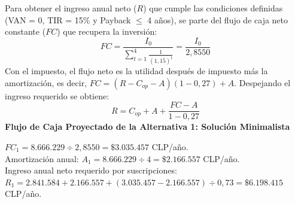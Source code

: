 Para obtener el ingreso anual neto ($R$) que cumple las condiciones definidas (VAN = 0, TIR = 15\% y Payback $\leq$ 4 años), se parte del flujo de caja neto constante ($FC$) que recupera la inversión:
\begin{equation}
    FC = \frac{I_0}{\displaystyle\sum_{t=1}^{4} \frac{1}{(1{,}15)^t}} = \frac{I_0}{2{,}8550}
\end{equation}
Con el impuesto, el flujo neto es la utilidad después de impuesto más la amortización, es decir, $FC = (R - C_{op} - A)(1 - 0{,}27) + A$. Despejando el ingreso requerido se obtiene:
\begin{equation}
    R = C_{op} + A + \frac{FC - A}{1 - 0{,}27}
\end{equation}
\newpage
\textbf{Flujo de Caja Proyectado de la Alternativa 1: Solución Minimalista}

$FC_1 = 8.666.229 \div 2{,}8550 = \$3.035.457$ CLP/año.\\
Amortización anual: $A_1 = 8.666.229 \div 4 = \$2.166.557$ CLP/año.\\
Ingreso anual neto requerido por suscripciones:\\ $R_1 = 2.841.584 + 2.166.557 + (3.035.457 - 2.166.557) \div 0{,}73 = \$6.198.415$ CLP/año.




